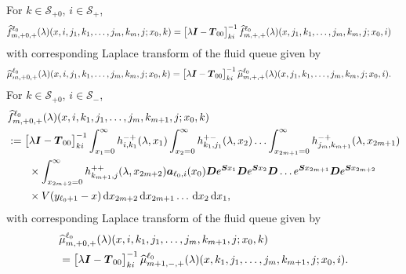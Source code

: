 For \(k\in\mathcal S_{+0}\), \(i\in\mathcal S_+\),
\begin{align}
		&\widehat{f}_{m,+0,+}^{\ell_0}(\lambda)(x,i,j_1,k_1,\dots,j_m,k_m,j;x_0,k) 
		=\vligne{\lambda \bs I - \bs T_{00}}^{-1}_{ki}\widehat{f}_{m,+,+}^{\ell_0}(\lambda)(x,j_1,k_1,\dots,j_m,k_m,j;x_0,i)
		\label{eqn: k0jJ0asfca134}%
\end{align} 
with corresponding Laplace transform of the fluid queue given by 
\begin{align}
	&\widehat \mu_{m,+0,+}^{\ell_0}(\lambda)(x,i,j_1,k_1,\dots,j_m,k_m,j;x_0,k) \nonumber 
	= \begin{bmatrix} \lambda \boldsymbol I - \boldsymbol T_{00} \end{bmatrix}^{-1}_{ki}\widehat \mu_{m,+,+}^{\ell_0}(\lambda)(x,j_1,k_1,\dots,j_m,k_m,j;x_0,i).
\end{align}
For \(k\in\mathcal S_{+0}\), \(i\in\mathcal S_-\),
\begin{align}
	&\widehat{f}_{m,+0,+}^{\ell_0}(\lambda)(x,i,k_1,j_1,\dots,j_m,k_{m+1},j;x_0,k)\nonumber 
	\\&:=\begin{bmatrix} \lambda \boldsymbol I - \boldsymbol T_{00} \end{bmatrix}^{-1}_{ki}\int_{x_1=0}^\infty h^{-+}_{i,k_{1}}(\lambda,x_1)\nonumber
	\int_{x_2=0}^\infty h^{+-}_{k_1,j_1}(\lambda,x_2)
	\hdots \int_{x_{2m+1}=0}^\infty h^{-+}_{j_{m},k_{m+1}}(\lambda, x_{2m+1}) 
	\\&\qquad \times\int_{x_{2m+2}=0}^\infty h^{++}_{k_{m+1},j}(\lambda,x_{2m+2})
	 \boldsymbol   a_{\ell_0,i}(x_0)\boldsymbol De^{\boldsymbol{S}x_1} \boldsymbol{D} e^{\boldsymbol{S}x_2} \boldsymbol{D}\dots e^{\boldsymbol{S}x_{2m+1}}  \boldsymbol{D}e^{\boldsymbol{S}x_{2m+2}} \nonumber 
	 \\&\qquad{}\times V(y_{\ell_0+1}-x)  \, \mathrm{d} x_{2m+2} \, \mathrm{d} x_{2m+1}\dots\, \mathrm{d} x_2 \, \mathrm{d} x_1,\label{eqn: k0jJ0AAAaAA}
\end{align}
with corresponding Laplace transform of the fluid queue given by 
\begin{align}
	&\widehat \mu_{m,+0,+}^{\ell_0}(\lambda)(x,i,k_1,j_1,\dots,j_m,k_{m+1},j;x_0,k) \nonumber 
	\\&= \begin{bmatrix} \lambda \boldsymbol I - \boldsymbol T_{00} \end{bmatrix}^{-1}_{ki}\widehat \mu_{m+1,-,+}^{\ell_0}(\lambda)(x,k_1,j_1,\dots,j_m,k_{m+1},j;x_0,i).
\end{align}
